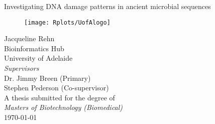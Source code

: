 \documentclass[12pt, a4paper]{article}
\begin{document}
	\begin{titlepage}
		\begin{center} 
		\huge{Investigating DNA damage patterns in ancient microbial sequences}\\[2cm]
		\begin{figure}[H]
		\centering
			\texttt{[image: Rplots/UofAlogo]}\\[2cm]
		\end{figure}
		\large{Jacqueline Rehn}\\[0.2cm]
		\large{Bioinformatics Hub}\\[0.2cm]
		\large{University of Adelaide}\\[1cm]
		\large\textit{Supervisors}\\[0.2cm]
		\large{Dr. Jimmy Breen (Primary)}\\[0.2cm]
		\large{Stephen Pederson (Co-supervisor)}\\[1cm]
		\large{A thesis submitted for the degree of}\\[0.2cm] 
		\large{\textit{Masters of Biotechnology (Biomedical)}}\\[0.2cm]
		\large{\today}\\[1cm]
		
		\end{center}
	\end{titlepage}
\doublespace
\justify
\sloppy

\tableofcontents
\thispagestyle{empty}
\cleardoublepage


\listoffigures
{}
\cleardoublepage

\listoftables
{}
\cleardoublepage


\singlespacing
\printnoidxglossary[style=altlist,title={\numberline{}Glossary}]\label{sec:glossary}

\renewcommand{\glsnamefont}[1]{\textbf{#1}} %
\printnoidxglossary[type=\acronymtype, style=super, title={\numberline{}List of Abbreviaitons}]\label{sec:acronyms}
\newpage
\doublespacing
\end{document}
